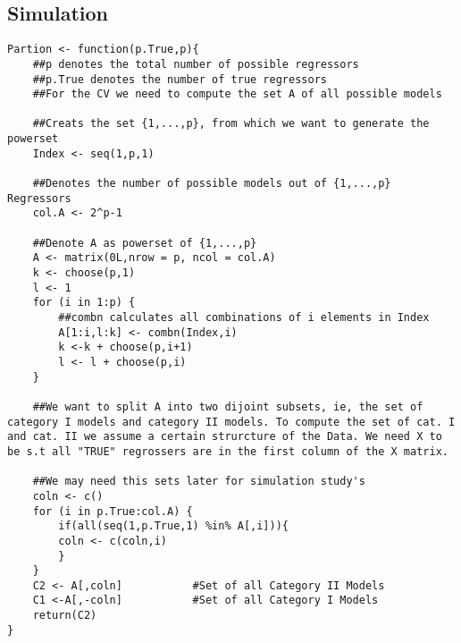 \documentclass[Research_Module_ES.tex]{subfiles}
\begin{document}
\subsection*{Simulation}
\begin{lstlisting}[title={Function inorder to calculate the set of category I and II models }]
Partion <- function(p.True,p){
	##p denotes the total number of possible regressors 
	##p.True denotes the number of true regressors
	##For the CV we need to compute the set A of all possible models 
	
	##Creats the set {1,...,p}, from which we want to generate the powerset
	Index <- seq(1,p,1)                        

	##Denotes the number of possible models out of {1,...,p} Regressors 
	col.A <- 2^p-1                                           

	##Denote A as powerset of {1,...,p}
	A <- matrix(0L,nrow = p, ncol = col.A)      
	k <- choose(p,1)
	l <- 1
	for (i in 1:p) {
		##combn calculates all combinations of i elements in Index
		A[1:i,l:k] <- combn(Index,i)             
		k <-k + choose(p,i+1)
		l <- l + choose(p,i)
	}

	##We want to split A into two dijoint subsets, ie, the set of category I models and category II models. To compute the set of cat. I and cat. II we assume a certain strurcture of the Data. We need X to be s.t all "TRUE" regrossers are in the first column of the X matrix.
	
	##We may need this sets later for simulation study's
	coln <- c()
	for (i in p.True:col.A) {
		if(all(seq(1,p.True,1) %in% A[,i])){    
		coln <- c(coln,i)
		}
	}
	C2 <- A[,coln]           #Set of all Category II Models
	C1 <-A[,-coln]           #Set of all Category I Models
	return(C2)
}
\end{lstlisting}
\end{document}

